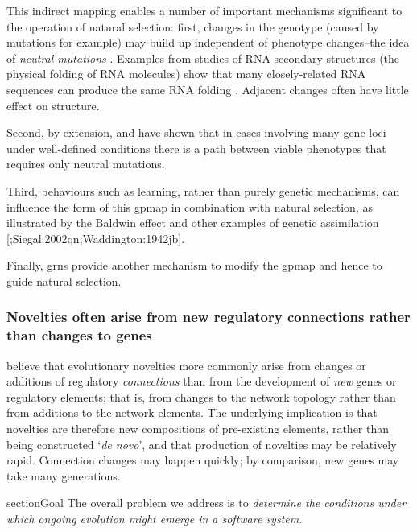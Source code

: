 This indirect mapping enables a number of important mechanisms
significant to the operation of natural selection: first, changes in the
genotype (caused by mutations for example) may build up independent of
phenotype changes--the idea of \emph{neutral mutations}
\autocite{Ohta:1996vn,Ohta:2002ys,Ohta:1973kx}. Examples from studies
of RNA secondary structures (the physical folding of RNA molecules) show
that many closely-related RNA sequences can produce the same RNA folding
\autocite{Fontana:1993zn}. Adjacent changes often have little effect on
structure.

Second, by extension, \autocite{Gavrilets:1997qt} and
\autocite{Gravner:2007yd} have shown that in cases involving many gene
loci under well-defined conditions there is a path between viable
phenotypes that requires only neutral mutations.

Third, behaviours such as learning, rather than purely genetic
mechanisms, can influence the form of this \gls{gpmap} in combination
with natural selection, as illustrated by the Baldwin effect
\autocite{Baldwin:1896ly} and other examples of genetic assimilation
{[}\autocite{Hinton:1987vy};Siegal:2002qn;Waddington:1942jb{]}.

Finally, \glspl{grn} provide another mechanism to modify the \gls{gpmap}
and hence to guide natural selection.

\subsubsection{Novelties often arise from new regulatory connections rather than changes to genes}
\label{novelties-often-arise-from-new-regulatory-connections-rather-than-changes-to-genes}

\autocite{Prudhomme:2007ax} believe that evolutionary novelties more
commonly arise from changes or additions of regulatory
\emph{connections} than from the development of \emph{new} genes or
regulatory elements; that is, from changes to the network topology
rather than from additions to the network elements. The underlying
implication is that novelties are therefore new compositions of
pre-existing elements, rather than being constructed `\emph{de novo}',
and that production of novelties may be relatively rapid. Connection
changes may happen quickly; by comparison, new genes may take many generations.

section{Goal}
The overall problem we address is to \textit{determine the conditions under which ongoing evolution might emerge in a software system}. 

